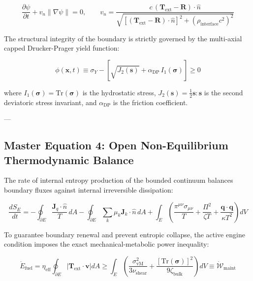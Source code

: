 \documentclass[11pt,a4paper]{article}
\theoremstyle{definition}
\theoremstyle{remark}
\begin{document}
\begin{equation}
\boxed{\frac{\partial \psi}{\partial t} + v_n \|\nabla \psi\| = 0, \qquad v_n = \frac{c \, (\mathbf{T}_{\text{ext}} - \mathbf{R}) \cdot \hat{n}}{\sqrt{[(\mathbf{T}_{\text{ext}} - \mathbf{R}) \cdot \hat{n}]^2 + (\rho_{\text{interface}} c^2)^2}}}
\end{equation}


The structural integrity of the boundary is strictly governed by the multi-axial capped Drucker-Prager yield function:


\begin{equation}
\boxed{\phi(\mathbf{x}, t) \equiv \sigma_Y - \left[ \sqrt{J_2(\mathbf{s})} + \alpha_{\text{DP}} \, I_1(\boldsymbol{\sigma}) \right] \ge 0}
\end{equation}


where $I_1(\boldsymbol{\sigma}) = \mathrm{Tr}(\boldsymbol{\sigma})$ is the hydrostatic stress, $J_2(\mathbf{s}) = \frac{1}{2}\mathbf{s} : \mathbf{s}$ is the second deviatoric stress invariant, and $\alpha_{\text{DP}}$ is the friction coefficient.

---

\subsection{Master Equation 4: Open Non-Equilibrium Thermodynamic Balance}
The rate of internal entropy production of the bounded continuum balances boundary fluxes against internal irreversible dissipation:


\begin{equation}
\boxed{\frac{dS_E}{dt} = -\oint_{\partial E} \frac{\mathbf{J}_q \cdot \hat{n}}{T} \, dA - \oint_{\partial E} \sum_k \mu_k \mathbf{J}_k \cdot \hat{n} \, dA + \int_E \left( \frac{\pi^{\mu\nu}\sigma_{\mu\nu}}{T} + \frac{\Pi^2}{\zeta T} + \frac{\mathbf{q} \cdot \mathbf{q}}{\kappa T^2} \right) dV}
\end{equation}


To guarantee boundary renewal and prevent entropic collapse, the active engine condition imposes the exact mechanical-metabolic power inequality:


\begin{equation}
\boxed{\dot{E}_{\text{fuel}} = \eta_{\text{eff}} \oint_{\partial E} \left| \mathbf{T}_{\text{ext}} \cdot \mathbf{v} \right| dA \ge \int_E \left( \frac{\sigma_{\mathrm{vM}}^2}{3\nu_{\text{shear}}} + \frac{[\mathrm{Tr}(\boldsymbol{\sigma})]^2}{9\zeta_{\text{bulk}}} \right) dV \equiv \dot{\mathcal{W}}_{\text{maint}}}
\end{equation}
\end{document}
